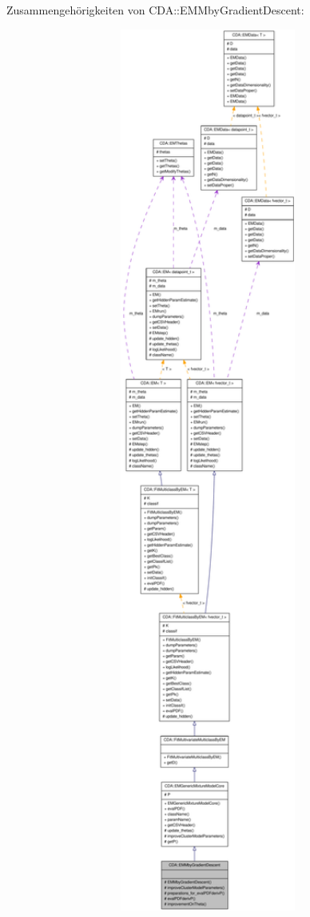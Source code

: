 Zusammengehörigkeiten von CDA::EMMbyGradientDescent:\nopagebreak
\begin{figure}[H]
\begin{center}
\leavevmode
\includegraphics[width=400pt]{classCDA_1_1EMMbyGradientDescent__coll__graph}
\end{center}
\end{figure}
